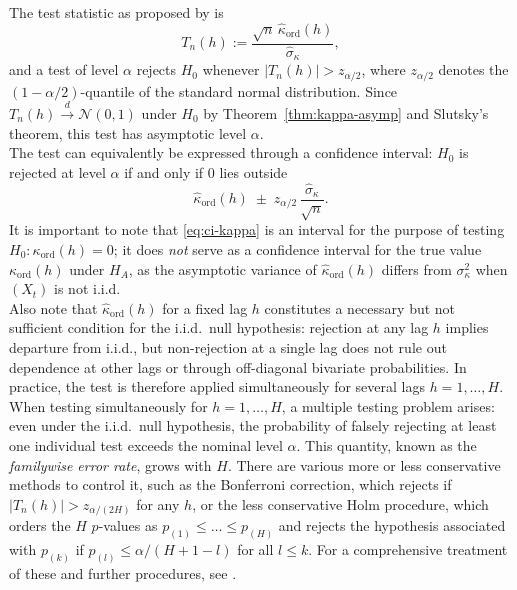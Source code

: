 ﻿\documentclass[12pt,a4paper]{scrreprt}
\theoremstyle{definition}
\newtheorem{remark}[theorem]{Remark}
\begin{document}
The test statistic as proposed by \citet{weiss2021categorical} is
\[
    T_n(h) := \frac{\sqrt{n}\,\hat{\kappa}_{\mathrm{ord}}(h)}
                   {\hat{\sigma}_\kappa},
\]
and a test of level $\alpha$ rejects $H_0$ whenever
$|T_n(h)| > z_{\alpha/2}$, where $z_{\alpha/2}$ denotes the
$(1-\alpha/2)$-quantile of the standard normal distribution.
Since $T_n(h) \xrightarrow{d} \mathcal{N}(0,1)$ under $H_0$ by
Theorem~\ref{thm:kappa-asymp} and Slutsky's theorem, this test has
asymptotic level $\alpha$.\\
The test can equivalently be expressed through a confidence interval:
$H_0$ is rejected at level $\alpha$ if and only if $0$ lies outside
\begin{equation*}\label{eq:ci-kappa}
    \hat{\kappa}_{\mathrm{ord}}(h)
    \;\pm\;
    z_{\alpha/2}\,\frac{\hat{\sigma}_\kappa}{\sqrt{n}}.
\end{equation*}
It is important to note that \eqref{eq:ci-kappa} is an interval for
the purpose of testing $H_0: \kappa_{\mathrm{ord}}(h) = 0$; it does
\emph{not} serve as a confidence interval for the true value
$\kappa_{\mathrm{ord}}(h)$ under $H_A$, as the asymptotic variance
of $\hat{\kappa}_{\mathrm{ord}}(h)$ differs from $\sigma^2_\kappa$
when $(X_t)$ is not i.i.d.\\
Also note that $\hat{\kappa}_{\mathrm{ord}}(h)$ for a fixed lag $h$ 
constitutes a necessary but not sufficient condition for the i.i.d.\ 
null hypothesis: rejection at any lag $h$ implies departure from 
i.i.d., but non-rejection at a single lag does not rule out 
dependence at other lags or through off-diagonal bivariate 
probabilities. In practice, the test is therefore applied 
simultaneously for several lags $h = 1, \ldots, H$.\\
When testing simultaneously for $h = 1, \ldots, H$, a multiple testing 
problem arises: even under the i.i.d.\ null hypothesis, the probability 
of falsely rejecting at least one individual test exceeds the nominal 
level $\alpha$. This quantity, known as the \emph{familywise error rate}, 
grows with $H$. There are various more or less conservative methods to 
control it, such as the Bonferroni correction, which rejects if 
$|T_n(h)| > z_{\alpha/(2H)}$ for any $h$, or the less conservative 
Holm procedure, which orders the $H$ $p$-values as 
$p_{(1)} \leq \ldots \leq p_{(H)}$ and rejects the hypothesis 
associated with $p_{(k)}$ if $p_{(l)} \leq \alpha/(H+1-l)$ for all 
$l \leq k$. For a comprehensive treatment of these and further 
procedures, see \citet[pp.~348--391]{lehmann_romano_2005}.
\end{document}

